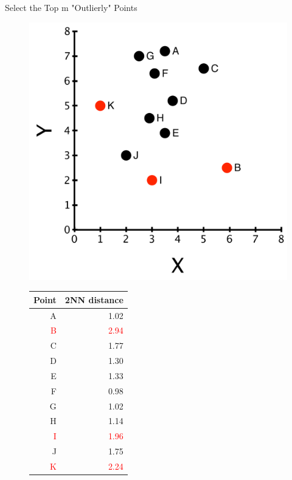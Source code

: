 \documentclass[aspectratio=169]{beamer}
\begin{document}
\begin{frame}{Select the Top m "Outlierly" Points}

\begin{figure}[ht]
\begin{minipage}[b]{0.5\linewidth}
\centering
\includegraphics[width=\textwidth]{lectOutliers/outliersPtsLabeled3Most.pdf}
\end{minipage}
\hspace{0.5cm}
\begin{minipage}[b]{0.4\linewidth}
\centering
\small{
\begin {table}[!htbp]
\begin{center}
\begin{tabular}{|r|r|}
\hline
Point & 2NN distance \\ \hline
A & 1.02 \\ \hline
\textcolor{red}{B} & \textcolor{red}{2.94}  \\ \hline
C & 1.77 \\ \hline
D & 1.30 \\ \hline
E & 1.33  \\ \hline
F & 0.98 \\ \hline
G & 1.02 \\ \hline
H & 1.14 \\ \hline
\textcolor{red}{I} & \textcolor{red}{1.96} \\ \hline
J & 1.75 \\ \hline
\textcolor{red}{K} & \textcolor{red}{2.24} \\ \hline
\end{tabular}
\end{center}
\end{table}
}

\end{minipage}
\end{figure}

\end{frame}
\end{document}
